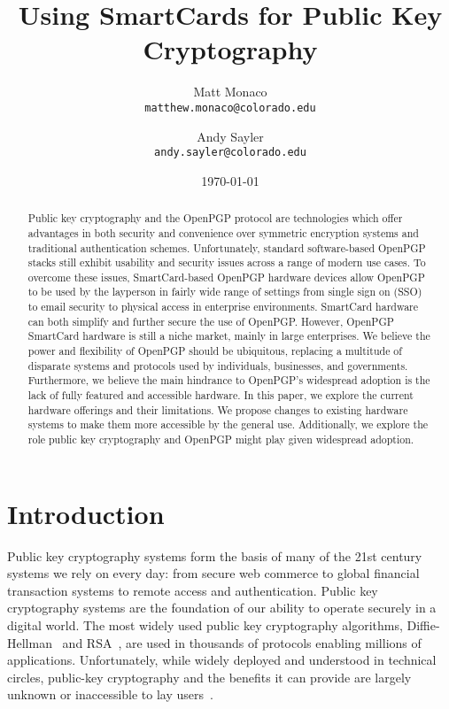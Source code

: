 \documentclass[11pt, twocolumn]{article}
\begin{document}
\title{Using SmartCards for Public Key Cryptography}

\author{
  Matt Monaco \\ \texttt{matthew.monaco@colorado.edu} \and
  Andy Sayler \\ \texttt{andy.sayler@colorado.edu}
}

\date{\today}

\maketitle

\begin{abstract}
Public key cryptography and the OpenPGP protocol are technologies
which offer advantages in both security and convenience over symmetric
encryption systems and traditional authentication
schemes. Unfortunately, standard software-based OpenPGP stacks still
exhibit usability and security issues across a range of modern use
cases. To overcome these issues, SmartCard-based OpenPGP hardware
devices allow OpenPGP to be used by the layperson in fairly wide range
of settings from single sign on (SSO) to email security to physical
access in enterprise environments. SmartCard hardware can both
simplify and further secure the use of OpenPGP. However, OpenPGP
SmartCard hardware is still a niche market, mainly in large
enterprises. We believe the power and flexibility of OpenPGP should be
ubiquitous, replacing a multitude of disparate systems and protocols
used by individuals, businesses, and governments. Furthermore, we
believe the main hindrance to OpenPGP's widespread adoption is the
lack of fully featured and accessible hardware. In this paper, we
explore the current hardware offerings and their limitations. We
propose changes to existing hardware systems to make them more
accessible by the general use. Additionally, we explore the role
public key cryptography and OpenPGP might play given widespread
adoption.
\end{abstract}

\section{Introduction}
\label{sec:intro}

Public key cryptography systems form the basis of many of the 21st
century systems we rely on every day: from secure web commerce to
global financial transaction systems to remote access and
authentication. Public key cryptography systems are the foundation of
our ability to operate securely in a digital world. The most widely
used public key cryptography algorithms,
Diffie-Hellman~\cite{diffie1976} and RSA~\cite{rivest1978}, are used
in thousands of protocols enabling millions of
applications. Unfortunately, while widely deployed and understood in
technical circles, public-key cryptography and the benefits it can
provide are largely unknown or inaccessible to lay
users~\cite{whitten1999}.
\end{document}
